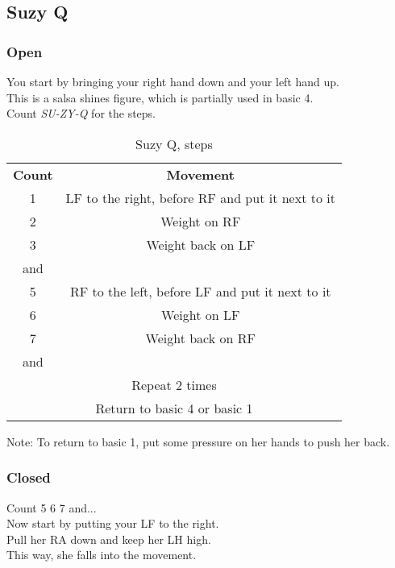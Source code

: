\subsection{Suzy Q}
\subsubsection{Open}
You start by bringing your right hand down and your left hand up.\\
This is a salsa shines figure, which is partially used in basic 4.\\
Count \textit{SU-ZY-Q} for the steps.\\
\begin{table}[H]
\centering
\begin{tabular}{cc}
  \toprule
  \textbf{Count} & \textbf{Movement}\\
  \cmidrule(lr){1-1}\cmidrule(lr){2-2}
  1 & LF to the right, before RF and put it next to it\\
  2 & Weight on RF\\
  3 & Weight back on LF\\
  and & \\
  5 & RF to the left, before LF and put it next to it\\
  6 & Weight on LF\\
  7 & Weight back on RF\\
  and & \\
  \multicolumn{2}{c}{Repeat 2 times}\\
  \multicolumn{2}{c}{Return to basic 4 or basic 1}\\
  \bottomrule
\end{tabular}
\label{suzyq_steps}
\caption{Suzy Q, steps}
\end{table}

Note: To return to basic 1, put some pressure on her hands to push her back.

\subsubsection{Closed}
Count 5 6 7 and...\\
Now start by putting your LF to the right.\\
Pull her RA down and keep her LH high.\\
This way, she falls into the movement.
